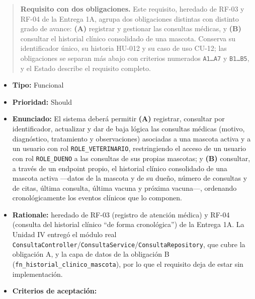 \documentclass[
  spanish,
]{article}
\providecommand{\tightlist}{%
  \setlength{\itemsep}{0pt}\setlength{\parskip}{0pt}}
\begin{document}
\begin{quote}
\textbf{Requisito con dos obligaciones.} Este requisito, heredado de
RF-03 y RF-04 de la Entrega 1A, agrupa dos obligaciones distintas con
distinto grado de avance: \textbf{(A)} registrar y gestionar las
consultas médicas, y \textbf{(B)} consultar el historial clínico
consolidado de una mascota. Conserva su identificador único, su historia
HU-012 y su caso de uso CU-12; las obligaciones se separan más abajo con
criterios numerados \texttt{A1…A7} y \texttt{B1…B5}, y el Estado
describe el requisito completo.
\end{quote}

\begin{itemize}
\tightlist
\item
  \textbf{Tipo:} Funcional
\item
  \textbf{Prioridad:} Should
\item
  \textbf{Enunciado:} El sistema deberá permitir \textbf{(A)} registrar,
  consultar por identificador, actualizar y dar de baja lógica las
  consultas médicas (motivo, diagnóstico, tratamiento y observaciones)
  asociadas a una mascota activa y a un usuario con rol
  \texttt{ROLE\_\allowbreak{}VETERINARIO}, restringiendo el acceso de un usuario con
  rol \texttt{ROLE\_\allowbreak{}DUENO} a las consultas de sus propias mascotas; y
  \textbf{(B)} consultar, a través de un endpoint propio, el historial
  clínico consolidado de una mascota activa ---datos de la mascota y de
  su dueño, número de consultas y de citas, última consulta, última
  vacuna y próxima vacuna---, ordenando cronológicamente los eventos
  clínicos que lo componen.
\item
  \textbf{Rationale:} heredado de RF-03 (registro de atención médica) y
  RF-04 (consulta del historial clínico ``de forma cronológica'') de la
  Entrega 1A. La Unidad IV entregó el módulo real
  \texttt{Consulta\allowbreak{}Controller}/\texttt{Consulta\allowbreak{}Service}/\texttt{Consulta\allowbreak{}Repository},
  que cubre la obligación A, y la capa de datos de la obligación B
  (\texttt{fn\_\allowbreak{}historial\_\allowbreak{}clini\allowbreak{}co\_\allowbreak{}mascota}), por lo que el requisito
  deja de estar sin implementación.
\item
  \textbf{Criterios de aceptación:}


\end{itemize}
\end{document}
